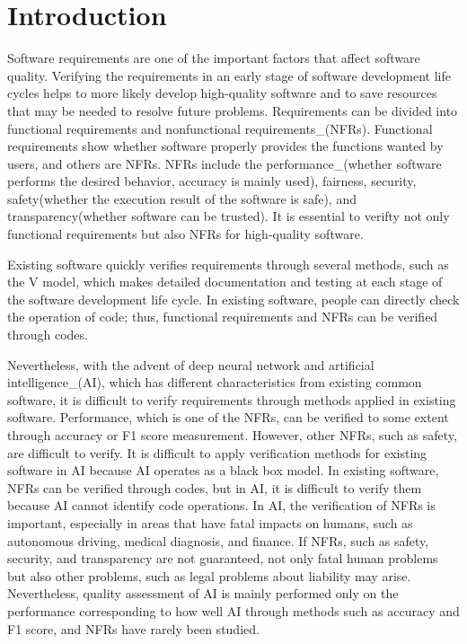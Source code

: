 \documentclass[journal,article,submit,moreauthors,pdftex]{Definitions/mdpi}
\begin{document}
\section{Introduction}

Software requirements are one of the important factors that affect software quality.
Verifying the requirements in an early stage of software development life cycles helps to more likely develop high-quality software and to save resources that may be needed to resolve future problems.
Requirements can be divided into functional requirements and nonfunctional requirements\_(NFRs).
Functional requirements show whether software properly provides the functions wanted by users, and others are NFRs.
NFRs include the performance\_(whether software performs the desired behavior, accuracy is mainly used), fairness\cite{fairness-microsoft, fairness-dwork, fairness-feldman, fairness-tramer, fairness-zhang, fairness-zemel}, security\cite{security-mei, security-mei2, security-barreno}, safety(whether the execution result of the software is safe)\cite{safety-amodei,safety-juric,safety-leike}, and transparency(whether software can be trusted)\cite{transparency-yosinski,xai-transparency-ribeiro,xai-transparency-murdoch}.
It is essential to verifty not only functional requirements but also NFRs for high-quality software.

Existing software quickly verifies requirements through several methods, such as the V model, which makes detailed documentation and testing at each stage of the software development life cycle.
In existing software, people can directly check the operation of code; thus, functional requirements and NFRs can be verified through codes.

Nevertheless, with the advent of deep neural network and artificial intelligence\_(AI), which has different characteristics from existing common software, it is difficult to verify requirements through methods applied in existing software.
Performance, which is one of the NFRs, can be verified to some extent through accuracy or F1 score measurement. However, other NFRs, such as safety, are difficult to verify.
It is difficult to apply verification methods for existing software in AI because AI operates as a black box model. In existing software, NFRs can be verified through codes, but in AI, it is difficult to verify them because AI cannot identify code operations.
In AI, the verification of NFRs is important, especially in areas that have fatal impacts on humans, such as autonomous driving\cite{ai-driving-bajarski,ai-driving-levinson}, medical diagnosis\cite{ai-medical-ramsundar,ai-medical-vieira,ai-medical-xai-holzinger,ai-medical-krause,ai-medical-tan,ai-medical-pesapane,ai-medical-miller}, and finance\cite{ai-finance-fu}.
If NFRs, such as safety, security, and transparency are not guaranteed, not only fatal human problems but also other problems, such as legal problems about liability may arise.
Nevertheless, quality assessment of AI is mainly performed only on the performance corresponding to how well AI through methods such as accuracy and F1 score, and NFRs have rarely been studied.
\end{document}
